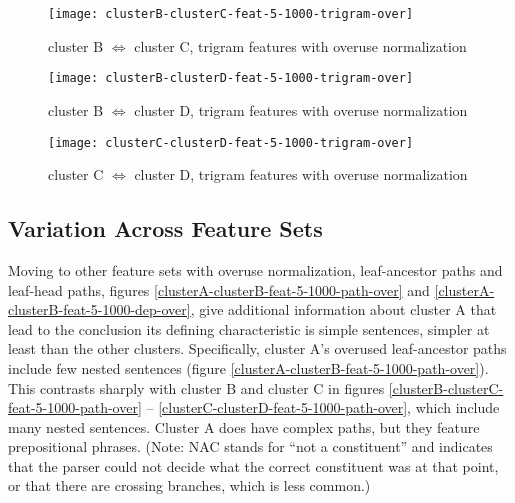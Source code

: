 \begin{figure}
  \texttt{[image: clusterB-clusterC-feat-5-1000-trigram-over]}
  \caption{cluster B $\Leftrightarrow$ cluster C, trigram features
    with overuse normalization}
  \label{clusterB-clusterC-feat-5-1000-trigram-over}
\end{figure}
\begin{figure}
  \texttt{[image: clusterB-clusterD-feat-5-1000-trigram-over]}
  \caption{cluster B $\Leftrightarrow$ cluster D, trigram features
    with overuse normalization}
  \label{clusterB-clusterD-feat-5-1000-trigram-over}
\end{figure}
\begin{figure}
  \texttt{[image: clusterC-clusterD-feat-5-1000-trigram-over]}
  \caption{cluster C $\Leftrightarrow$ cluster D, trigram features
    with overuse normalization}
  \label{clusterC-clusterD-feat-5-1000-trigram-over}
\end{figure}

\subsection{Variation Across Feature Sets}
\label{feature-ranking-feature-sets}

Moving to other feature sets with overuse normalization, leaf-ancestor
paths and leaf-head paths, figures
\ref{clusterA-clusterB-feat-5-1000-path-over} and
\ref{clusterA-clusterB-feat-5-1000-dep-over}, give additional
information about cluster A that lead to the conclusion its defining
characteristic is simple sentences, simpler at least than the other
clusters. Specifically, cluster A's overused leaf-ancestor paths
include few nested sentences (figure
\ref{clusterA-clusterB-feat-5-1000-path-over}). This contrasts sharply
with cluster B and cluster C in figures
\ref{clusterB-clusterC-feat-5-1000-path-over} --
\ref{clusterC-clusterD-feat-5-1000-path-over}, which include many nested
sentences. Cluster A does have complex paths, but they feature
prepositional phrases. (Note: NAC stands for ``not a constituent'' and
indicates that the parser could not decide what the correct
constituent was at that point, or that there are crossing branches,
which is less common.)

